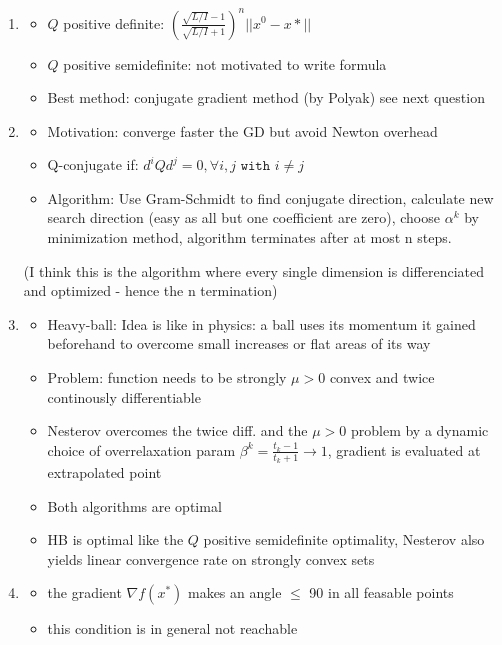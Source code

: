 \documentclass{report}
\begin{document}
\begin{enumerate}
\item \begin{itemize}
	\item $Q$ positive definite: $\left(\frac{\sqrt{L/I}-1}{\sqrt{L/I} + 1}\right)^n || x^0  - x* ||$
	\item $Q$ positive semidefinite: not motivated to write formula
	\item Best method: conjugate gradient method (by Polyak) see next question
\end{itemize}
\item \begin{itemize}
	\item Motivation: converge faster the GD but avoid Newton overhead
	\item Q-conjugate if: $d^i  Q d^j = 0, \forall i, j \texttt{ with } i \neq j$
	\item Algorithm: 
	Use Gram-Schmidt to find conjugate direction, calculate new search direction (easy as all but one coefficient are zero), choose $\alpha^k$ by minimization method, algorithm terminates after at most n steps. 
\end{itemize}
(I think this is the algorithm where every single dimension is differenciated and optimized - hence the n termination)
\item \begin{itemize}
	\item Heavy-ball: Idea is like in physics: a ball uses its momentum it gained beforehand to overcome small increases or flat areas of its way
	\item Problem: function needs to be strongly $\mu > 0$ convex and twice continously differentiable
	\item Nesterov overcomes the twice diff. and the $\mu > 0$ problem by a dynamic choice of overrelaxation param $\beta^k = \frac{t_k - 1}{t_k + 1} \rightarrow 1$, gradient is evaluated at extrapolated point
	\item Both algorithms are optimal
	\item HB is optimal like the $Q$ positive semidefinite optimality, Nesterov also yields linear convergence rate on strongly convex sets
	\end{itemize}
\item \begin{itemize}
	\item the gradient $\nabla f(x^*)$ makes an angle $\leq$ 90 in all feasable points
	\item this condition is in general not reachable


\end{itemize}
\end{enumerate}
\end{document}
